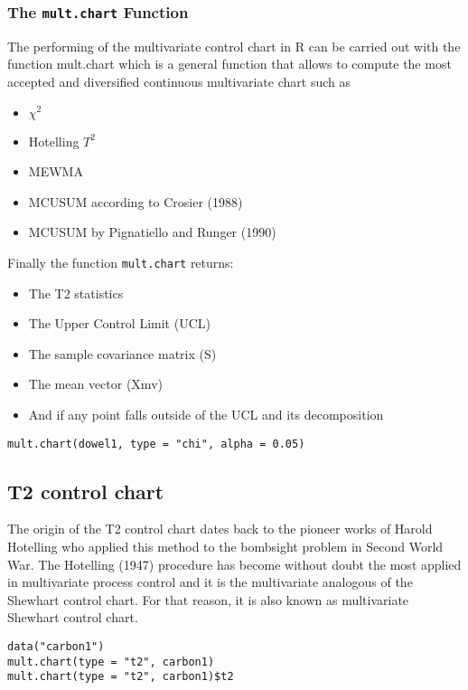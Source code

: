 \documentclass[SPC-MASTER.tex]{subfiles}
\begin{document}
\begin{frame}
\frametitle{The \texttt{mult.chart} Function}
The performing of the multivariate control chart in R can be carried out with the
function mult.chart which is a general function that allows to compute the most
accepted and diversified continuous multivariate chart such as

\begin{itemize} 
\item $\chi^2$
\item Hotelling $T^2$
\item MEWMA
\item MCUSUM according to Crosier (1988)
\item MCUSUM by Pignatiello and Runger (1990)
\end{itemize}
\end{frame}
\begin{frame}
Finally the function \texttt{mult.chart} returns:

\begin{itemize} 
\item The T2 statistics
\item The Upper Control Limit (UCL)
\item The sample covariance matrix (S)
\item The mean vector (Xmv)
\item And if any point falls outside of the UCL and its decomposition
\end{itemize}

\begin{framed}
\begin{verbatim}
mult.chart(dowel1, type = "chi", alpha = 0.05)
\end{verbatim}
\end{framed}
\end{frame}
\begin{frame}
\subsection{T2 control chart}
\large
The origin of the T2 control chart dates back to the pioneer works of Harold Hotelling
who applied this method to the bombsight problem in Second World War. The
Hotelling (1947) procedure has become without doubt the most applied in multivariate
process control and it is the multivariate analogous of the Shewhart control chart.
For that reason, it is also known as multivariate Shewhart control chart.
\begin{framed}
\begin{verbatim}
data("carbon1")
mult.chart(type = "t2", carbon1)
mult.chart(type = "t2", carbon1)$t2
\end{verbatim}
\end{framed}
\end{frame}
\end{document}
